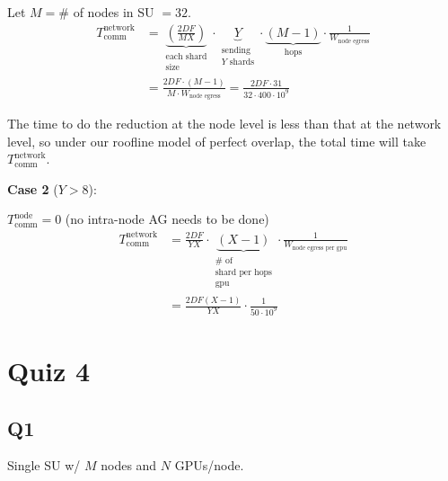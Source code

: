 \documentclass[11pt]{article}
\newcommand{\Tcomm}{T_{\text{comm}}}
\begin{document}
Let $M = \#$ of nodes in SU $= 32$.
\begin{align*}
\Tcomm^{\text{network}} &= \underbrace{\left(\frac{2DF}{MX}\right)}_{\substack{\text{each shard}\\ \text{size}}} \cdot \underbrace{Y}_{\substack{\text{sending}\\ Y \text{ shards}}} \cdot \underbrace{(M-1)}_{\text{hops}} \cdot \frac{1}{W_{\text{node egress}}} \\
&= \frac{2DF \cdot (M-1)}{M \cdot W_{\text{node egress}}} = \frac{2DF \cdot 31}{32 \cdot 400 \cdot 10^9}
\end{align*}

The time to do the reduction at the node level is less than that at the network level, so under our roofline model of perfect overlap, the total time will take $\Tcomm^{\text{network}}$.

\textbf{Case 2} ($Y > 8$):

$\Tcomm^{\text{node}} = 0$ (no intra-node AG needs to be done)
\begin{align*}
\Tcomm^{\text{network}} &= \frac{2DF}{YX} \cdot \underbrace{(X-1)}_{\substack{\# \text{ of}\\ \text{shard per hops}\\ \text{gpu}}} \cdot \frac{1}{W_{\text{node egress per gpu}}} \\
&= \frac{2DF(X-1)}{YX} \cdot \frac{1}{50 \cdot 10^9}
\end{align*}

\section*{Quiz 4}

\subsection*{Q1}

Single SU w/ $M$ nodes and $N$ GPUs/node.
\end{document}
